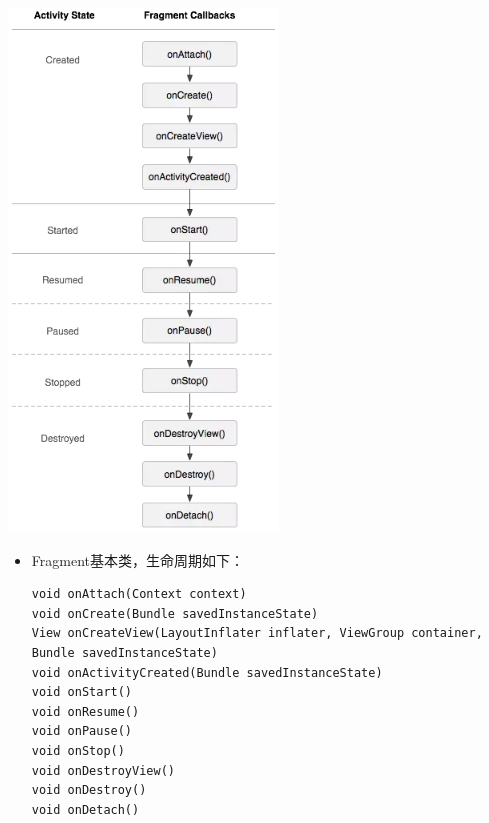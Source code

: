 \documentclass[9pt, b5paaper]{book}
\begin{document}
\includegraphics[width=.9\linewidth]{./pic/lifecyclecompare.png}

\begin{itemize}
\item Fragment基本类，生命周期如下：
\begin{verbatim}
void onAttach(Context context)
void onCreate(Bundle savedInstanceState)
View onCreateView(LayoutInflater inflater, ViewGroup container, Bundle savedInstanceState)
void onActivityCreated(Bundle savedInstanceState)
void onStart()
void onResume()
void onPause()
void onStop()
void onDestroyView()
void onDestroy()
void onDetach()
\end{verbatim}
\end{itemize}
\end{document}
